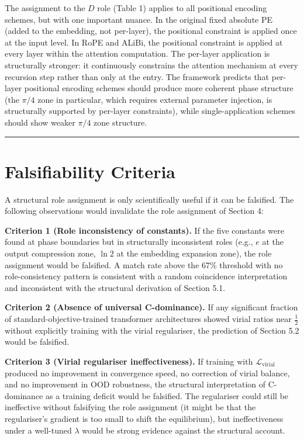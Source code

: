 \documentclass[12pt]{article}
\begin{document}
The assignment to the \(D\) role (Table 1) applies to all positional
encoding schemes, but with one important nuance. In the original fixed
absolute PE (added to the embedding, not per-layer), the positional
constraint is applied once at the input level. In RoPE and ALiBi, the
positional constraint is applied at every layer within the attention
computation. The per-layer application is structurally stronger: it
continuously constrains the attention mechanism at every recursion step
rather than only at the entry. The framework predicts that per-layer
positional encoding schemes should produce more coherent phase structure
(the \(\pi/4\) zone in particular, which requires external parameter
injection, is structurally supported by per-layer constraints), while
single-application schemes should show weaker \(\pi/4\) zone structure.

\begin{center}\rule{0.5\linewidth}{0.5pt}\end{center}

\section{Falsifiability Criteria}\label{falsifiability-criteria}

A structural role assignment is only scientifically useful if it can be
falsified. The following observations would invalidate the role
assignment of Section 4:

\textbf{Criterion 1 (Role inconsistency of constants).} If the five
constants were found at phase boundaries but in structurally
inconsistent roles (e.g., \(e\) at the output compression zone,
\(\ln 2\) at the embedding expansion zone), the role assignment would be
falsified. A match rate above the 67\% threshold with no
role-consistency pattern is consistent with a random coincidence
interpretation and inconsistent with the structural derivation of
Section 5.1.

\textbf{Criterion 2 (Absence of universal C-dominance).} If any
significant fraction of standard-objective-trained transformer
architectures showed virial ratios near \(\frac{1}{2}\) without
explicitly training with the virial regulariser, the prediction of
Section 5.2 would be falsified.

\textbf{Criterion 3 (Virial regulariser ineffectiveness).} If training
with \(\mathcal{L}_\text{virial}\) produced no improvement in
convergence speed, no correction of virial balance, and no improvement
in OOD robustness, the structural interpretation of C-dominance as a
training deficit would be falsified. The regulariser could still be
ineffective without falsifying the role assignment (it might be that the
regulariser's gradient is too small to shift the equilibrium), but
ineffectiveness under a well-tuned \(\lambda\) would be strong evidence
against the structural account.
\end{document}
